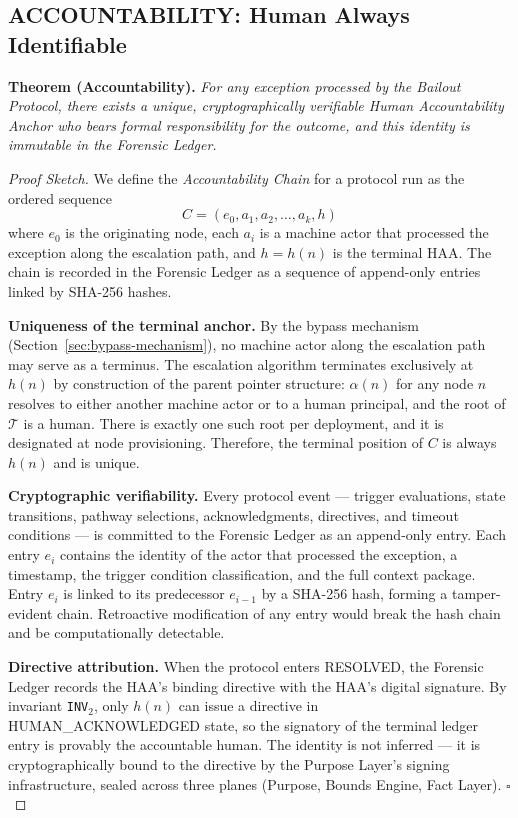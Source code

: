 \subsection{ACCOUNTABILITY: Human Always Identifiable}

\textbf{Theorem (Accountability).} \emph{For any exception processed by the Bailout Protocol, there exists a unique, cryptographically verifiable Human Accountability Anchor who bears formal responsibility for the outcome, and this identity is immutable in the Forensic Ledger.}

\begin{proof}[Proof Sketch]
We define the \emph{Accountability Chain} for a protocol run as the ordered sequence
\[
C = (e_0, a_1, a_2, \dots, a_k, h)
\]
where $e_0$ is the originating node, each $a_i$ is a machine actor that processed the exception along the escalation path, and $h = h(n)$ is the terminal HAA. The chain is recorded in the Forensic Ledger as a sequence of append-only entries linked by SHA-256 hashes.

\medskip\noindent\textbf{Uniqueness of the terminal anchor.} By the bypass mechanism (Section~\ref{sec:bypass-mechanism}), no machine actor along the escalation path may serve as a terminus. The escalation algorithm terminates exclusively at $h(n)$ by construction of the parent pointer structure: $\alpha(n)$ for any node $n$ resolves to either another machine actor or to a human principal, and the root of $\mathcal{T}$ is a human. There is exactly one such root per deployment, and it is designated at node provisioning. Therefore, the terminal position of $C$ is always $h(n)$ and is unique.

\medskip\noindent\textbf{Cryptographic verifiability.} Every protocol event — trigger evaluations, state transitions, pathway selections, acknowledgments, directives, and timeout conditions — is committed to the Forensic Ledger as an append-only entry. Each entry $e_i$ contains the identity of the actor that processed the exception, a timestamp, the trigger condition classification, and the full context package. Entry $e_i$ is linked to its predecessor $e_{i-1}$ by a SHA-256 hash, forming a tamper-evident chain. Retroactive modification of any entry would break the hash chain and be computationally detectable.

\medskip\noindent\textbf{Directive attribution.} When the protocol enters RESOLVED, the Forensic Ledger records the HAA's binding directive with the HAA's digital signature. By invariant \texttt{INV}$_2$, only $h(n)$ can issue a directive in HUMAN\_ACKNOWLEDGED state, so the signatory of the terminal ledger entry is provably the accountable human. The identity is not inferred — it is cryptographically bound to the directive by the Purpose Layer's signing infrastructure, sealed across three planes (Purpose, Bounds Engine, Fact Layer). \hfill $\square$
\end{proof}

